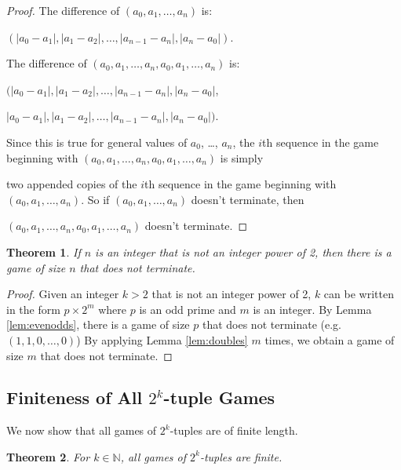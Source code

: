 \documentclass[12pt]{amsart}
\newtheorem{theorem}{Theorem}[section]
\newcommand{\znn}{\mathbb{N}}
\begin{document}
\begin{proof}

The difference of $(a_0, a_1, \ldots, a_{n})$ is:

\noindent
 $(|a_0 - a_1|, |a_1 - a_2|, \ldots, |a_{n-1} - a_n|, |a_n - a_0|)$.

\vspace{.2cm}

The difference of $(a_0, a_1, \ldots, a_{n}, a_0, a_1, \ldots, a_n)$ is:

\noindent
$(|a_0 - a_1|, |a_1 - a_2|, \ldots, |a_{n-1} - a_n|, |a_n - a_0|$,

\noindent
$|a_0 - a_1|, |a_1 - a_2|, \ldots, |a_{n-1} - a_n|, |a_n - a_0|)$.

Since this is true for general values of $a_0$, \ldots, $a_n$, the $i$th sequence in the game beginning with $(a_0, a_1, \ldots, a_{n}, a_0, a_1, \ldots, a_n)$ is simply

\noindent
two appended copies of the $i$th sequence in the game beginning with $(a_0, a_1, \ldots, a_{n})$. So if $(a_0, a_1, \ldots, a_{n})$ doesn't terminate, then 

\noindent
$(a_0, a_1, \ldots, a_{n}, a_0, a_1, \ldots, a_{n})$ doesn't terminate.

\end{proof}

\begin{theorem}
\label{theorem:notPowersOfTwo}
If $n$ is an integer that is not an integer power of 2, then there is a game of size $n$ that does not terminate.
\end{theorem}

\begin{proof}

Given an integer $k > 2$ that is not an integer power of 2, $k$ can be written in the form $p \times 2^{m}$ where $p$ is an odd prime and $m$ is an integer. By Lemma \ref{lem:evenodds}, there is a game of size $p$ that does not terminate (e.g. $(1,1,0, \ldots, 0)$) By applying Lemma \ref{lem:doubles} $m$ times, we obtain a game of size $m$ that does not terminate. 
\end{proof}

\subsection{Finiteness of All $2^k$-tuple Games}

We now show that all games of $2^k$-tuples are of finite length.

\begin{theorem}
For $k\in \znn$, all games of $2^k$-tuples are finite.
\end{theorem}
\end{document}
